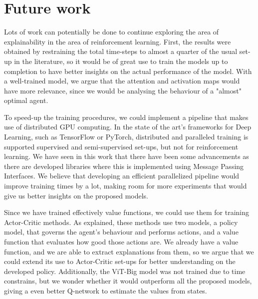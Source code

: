 \section{Future work}

Lots of work can potentially be done to continue exploring the area of explainability in the area of reinforcement learning. First, the results were obtained by restraining the total time-steps to almost a quarter of the usual set-up in the literature, so it would be of great use to train the models up to completion to have better insights on the actual performance of the model. With a well-trained model, we argue that the attention and activation maps would have more relevance, since we would be analysing the behaviour of a "almost" optimal agent. 

To speed-up the training procedures, we could implement a pipeline that makes use of distributed GPU computing. In the state of the art's frameworks for Deep Learning, such as TensorFlow or PyTorch, distributed and paralleled training is supported supervised and semi-supervised set-ups, but not for reinforcement learning. We have seen in this work that there have been some advancements as there are developed libraries where this is implemented using Message Passing Interfaces. We believe that developing an efficient parallelized pipeline would improve training times by a lot, making room for more experiments that would give us better insights on the proposed models.

Since we have trained effectively value functions, we could use them for training Actor-Critic methods. As explained, these methods use two models, a policy model, that governs the agent's behaviour and performs actions, and a value function that evaluates how good those actions are. We already have a value function, and we are able to extract explanations from them, so we argue that we could extend its use to Actor-Critic set-ups for better understanding on the developed policy. Additionally, the ViT-Big model was not trained due to time constrains, but we wonder whether it would outperform all the proposed models, giving a even better Q-network to estimate the values from states.


